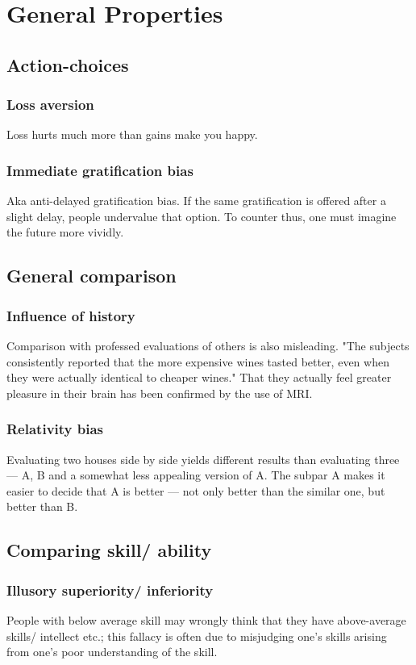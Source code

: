 \documentclass[oneside, article]{memoir}
\begin{document}
\section{General Properties}
\subsection{Action-choices}
\subsubsection{Loss aversion}
Loss hurts much more than gains make you happy.

\subsubsection{Immediate gratification bias}
Aka anti-delayed gratification bias. If the same gratification is offered after a slight delay, people undervalue that option. To counter thus, one must imagine the future more vividly.

\subsection{General comparison}
\subsubsection{Influence of history}
Comparison with professed evaluations of others is also misleading. "The subjects consistently reported that the more expensive wines tasted better, even when they were actually identical to cheaper wines." That they actually feel greater pleasure in their brain has been confirmed by the use of MRI.

\subsubsection{Relativity bias}
Evaluating two houses side by side yields different results than evaluating three — A, B and a somewhat less appealing version of A. The subpar A makes it easier to decide that A is better — not only better than the similar one, but better than B.

\subsection{Comparing skill/ ability}
\subsubsection{Illusory superiority/ inferiority}
People with below average skill may wrongly think that they have above-average skills/ intellect etc.; this fallacy is often due to misjudging one's skills arising from one's poor understanding of the skill.
\end{document}
